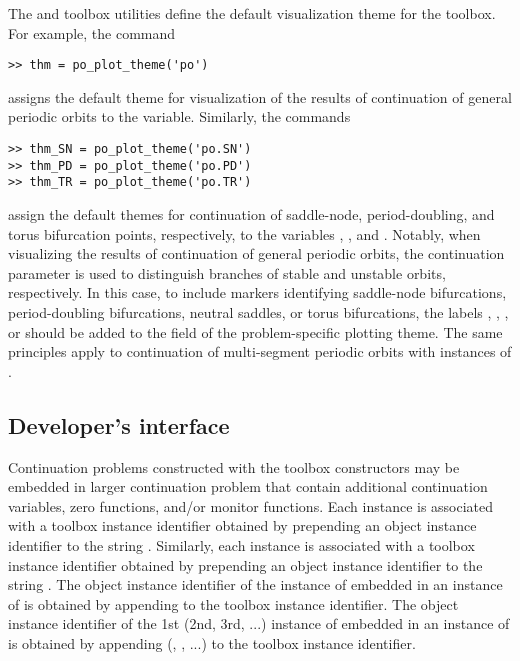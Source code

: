 The  and  toolbox utilities define the default visualization theme for the  toolbox. For example, the command
\begin{lstlisting}[language=coco-highlight]
>> thm = po_plot_theme('po')
\end{lstlisting}
assigns the default theme for visualization of the results of continuation of general periodic orbits to the  variable. Similarly, the commands
\begin{lstlisting}[language=coco-highlight]
>> thm_SN = po_plot_theme('po.SN')
>> thm_PD = po_plot_theme('po.PD')
>> thm_TR = po_plot_theme('po.TR')
\end{lstlisting}
assign the default themes for continuation of saddle-node, period-doubling, and torus bifurcation points, respectively, to the variables , , and . Notably, when visualizing the results of continuation of general periodic orbits, the continuation parameter  is used to distinguish branches of stable and unstable orbits, respectively. In this case, to include markers identifying saddle-node bifurcations, period-doubling bifurcations, neutral saddles, or torus bifurcations, the labels , , , or  should be added to the  field of the problem-specific plotting theme. The same principles apply to continuation of multi-segment periodic orbits with instances of .


\subsection{Developer's interface}
Continuation problems constructed with the  toolbox constructors may be embedded in larger continuation problem that contain additional continuation variables, zero functions, and/or monitor functions. Each  instance is associated with a toolbox instance identifier obtained by prepending an object instance identifier to the string . Similarly, each  instance is associated with a toolbox instance identifier obtained by prepending an object instance identifier to the string . The object instance identifier of the instance of  embedded in an instance of  is obtained by appending  to the  toolbox instance identifier. The object instance identifier of the 1st (2nd, 3rd, ...) instance of  embedded in an instance of  is obtained by appending  (, , ...) to the  toolbox instance identifier.

